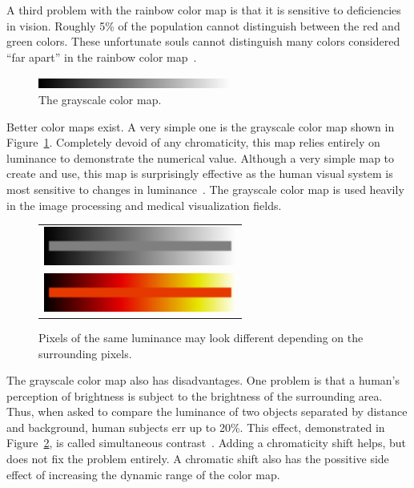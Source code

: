 \documentclass[review,journal]{vgtc}         %
\newcommand{\lcite}[1]{~\cite{#1}}
\begin{document}
A third problem with the rainbow color map is that it is sensitive to
deficiencies in vision.  Roughly 5\% of the population cannot distinguish
between the red and green colors.  These unfortunate souls cannot
distinguish many colors considered ``far apart'' in the rainbow color
map\lcite{Light04}.

\begin{figure}
  \centering
  \includegraphics[width=2.5in]{images/GrayscaleBar}
  \caption{The grayscale color map.}
  \label{fig:GrayscaleColorMap}
\end{figure}
Better color maps exist.  A very simple one is the grayscale
color map shown in Figure~\ref{fig:GrayscaleColorMap}.  Completely devoid
of any chromaticity, this map relies entirely on luminance to demonstrate
the numerical value.  Although a very simple map to create and use, this
map is surprisingly effective as the human visual system is most sensitive
to changes in luminance\lcite{Mullen85,Ware04}.  The grayscale color map is
used heavily in the image processing and medical visualization fields.

\begin{figure}
  \centering
  \begin{tabular}{c}
    \includegraphics[width=2.5in]{images/GrayscaleLocality} \\
    \includegraphics[width=2.5in]{images/BlackBodyLocality}
  \end{tabular}
  \caption{Pixels of the same luminance may look different depending on the
    surrounding pixels.}
  \label{fig:SimultaneousContrast}
\end{figure}
The grayscale color map also has disadvantages.  One problem is
that a human's perception of brightness is subject to the brightness of the
surrounding area.  Thus, when asked to compare the luminance of two objects
separated by distance and background, human subjects err up to 20\%.
This effect, demonstrated in Figure~\ref{fig:SimultaneousContrast}, is
called simultaneous contrast\lcite{Stone05}.  Adding a chromaticity shift
helps, but does not fix the problem entirely.  A chromatic shift also has
the possitive side effect of increasing the dynamic range of the color
map.
\end{document}
